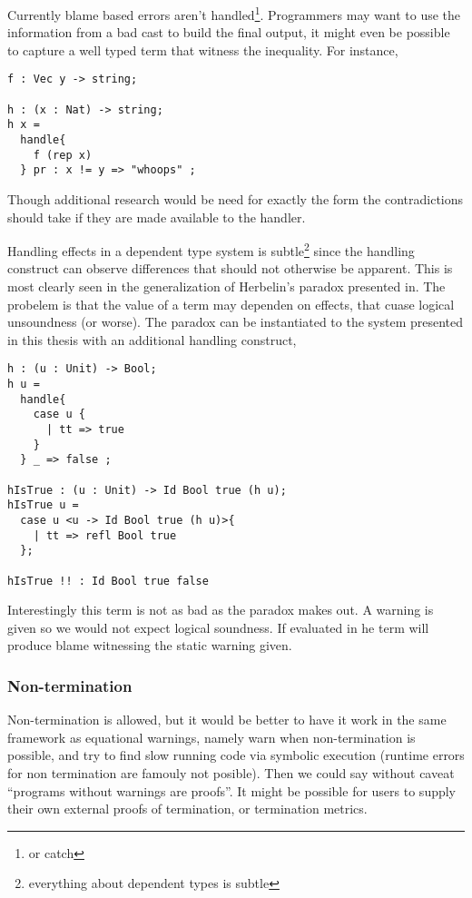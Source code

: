 Currently blame based errors aren't handled\footnote{or catch}.
Programmers may want to use the information from a bad cast to build the final output, it might even be possible to capture a well typed term that witness the inequality.
For instance,

\begin{lstlisting}
f : Vec y -> string;

h : (x : Nat) -> string;
h x =
  handle{
    f (rep x)
  } pr : x != y => "whoops" ;
\end{lstlisting}

Though additional research would be need for exactly the form the contradictions should take if they are made available to the handler.

Handling effects in a dependent type system is subtle\footnote{everything about dependent types is subtle} since the handling construct can observe differences that should not otherwise be apparent.
This is most clearly seen in the generalization of Herbelin's paradox presented in\cite{pedrot2020fire}.
The probelem is that the value of a \Bool{} term may dependen on effects, that cuase logical unsoundness (or worse).
The paradox can be instantiated to the system presented in this thesis with an additional handling construct,

\begin{lstlisting}
h : (u : Unit) -> Bool;
h u =
  handle{
    case u {
      | tt => true
    }
  } _ => false ;

hIsTrue : (u : Unit) -> Id Bool true (h u);
hIsTrue u =
  case u <u -> Id Bool true (h u)>{
    | tt => refl Bool true
  };

hIsTrue !! : Id Bool true false
\end{lstlisting}

Interestingly this term is not as bad as the paradox makes out.
A warning is given so we would not expect logical soundness.
If evaluated in \whnf{} he term will produce blame witnessing the static warning given.


\subsubsection{Non-termination}

Non-termination is allowed, but it would be better to have it work in the same framework as equational warnings, namely warn when non-termination is possible, and try to find slow running code via symbolic execution (runtime errors for non termination are famouly not posible).
Then we could say without caveat ``programs without warnings are proofs''.
It might be possible for users to supply their own external proofs of termination\cite{casinghino2014combining}, or termination metrics.

